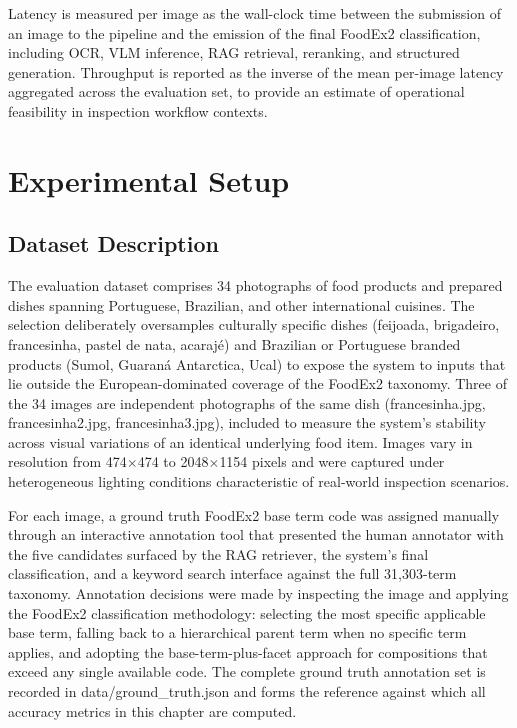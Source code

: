 Latency is measured per image as the wall-clock time between the submission of an image to the pipeline and the emission of the final FoodEx2 classification, including OCR, VLM inference, RAG retrieval, reranking, and structured generation. Throughput is reported as the inverse of the mean per-image latency aggregated across the evaluation set, to provide an estimate of operational feasibility in inspection workflow contexts.

\hypertarget{experimental-setup}{%
\section{Experimental Setup}\label{experimental-setup}}

\hypertarget{dataset-description}{%
\subsection{Dataset Description}\label{dataset-description}}

The evaluation dataset comprises 34 photographs of food products and prepared dishes spanning Portuguese, Brazilian, and other international cuisines. The selection deliberately oversamples culturally specific dishes (feijoada, brigadeiro, francesinha, pastel de nata, acarajé) and Brazilian or Portuguese branded products (Sumol, Guaraná Antarctica, Ucal) to expose the system to inputs that lie outside the European-dominated coverage of the FoodEx2 taxonomy. Three of the 34 images are independent photographs of the same dish (francesinha.jpg, francesinha2.jpg, francesinha3.jpg), included to measure the system's stability across visual variations of an identical underlying food item. Images vary in resolution from 474\(\times\)474 to 2048\(\times\)1154 pixels and were captured under heterogeneous lighting conditions characteristic of real-world inspection scenarios.

For each image, a ground truth FoodEx2 base term code was assigned manually through an interactive annotation tool that presented the human annotator with the five candidates surfaced by the RAG retriever, the system's final classification, and a keyword search interface against the full 31,303-term taxonomy. Annotation decisions were made by inspecting the image and applying the FoodEx2 classification methodology: selecting the most specific applicable base term, falling back to a hierarchical parent term when no specific term applies, and adopting the base-term-plus-facet approach for compositions that exceed any single available code. The complete ground truth annotation set is recorded in data/ground\_truth.json and forms the reference against which all accuracy metrics in this chapter are computed.

